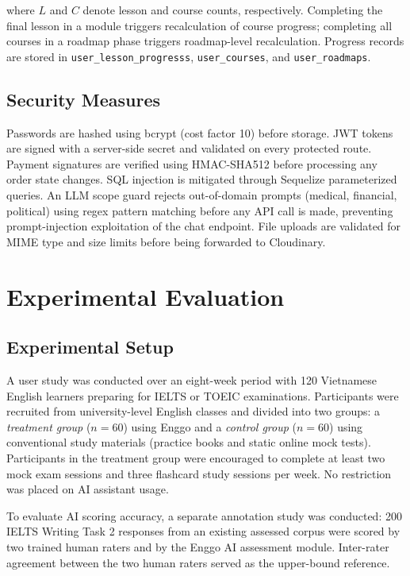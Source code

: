\documentclass[conference]{IEEEtran}
\begin{document}
where $L$ and $C$ denote lesson and course counts, respectively. Completing the final lesson in a module triggers recalculation of course progress; completing all courses in a roadmap phase triggers roadmap-level recalculation. Progress records are stored in \texttt{user\_lesson\_progresss}, \texttt{user\_courses}, and \texttt{user\_roadmaps}.

\subsection{Security Measures}
Passwords are hashed using bcrypt (cost factor 10) before storage. JWT tokens are signed with a server-side secret and validated on every protected route. Payment signatures are verified using HMAC-SHA512 before processing any order state changes. SQL injection is mitigated through Sequelize parameterized queries. An LLM scope guard rejects out-of-domain prompts (medical, financial, political) using regex pattern matching before any API call is made, preventing prompt-injection exploitation of the chat endpoint. File uploads are validated for MIME type and size limits before being forwarded to Cloudinary.

\section{Experimental Evaluation}

\subsection{Experimental Setup}
A user study was conducted over an eight-week period with 120 Vietnamese English learners preparing for IELTS or TOEIC examinations. Participants were recruited from university-level English classes and divided into two groups: a \textit{treatment group} ($n=60$) using Enggo and a \textit{control group} ($n=60$) using conventional study materials (practice books and static online mock tests). Participants in the treatment group were encouraged to complete at least two mock exam sessions and three flashcard study sessions per week. No restriction was placed on AI assistant usage.

To evaluate AI scoring accuracy, a separate annotation study was conducted: 200 IELTS Writing Task 2 responses from an existing assessed corpus were scored by two trained human raters and by the Enggo AI assessment module. Inter-rater agreement between the two human raters served as the upper-bound reference.
\end{document}
